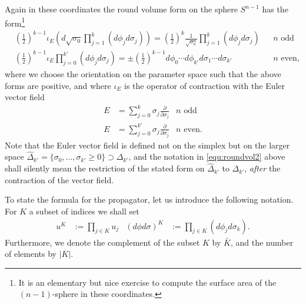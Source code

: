 \documentclass[a4paper]{amsart}
\theoremstyle{plain}
\theoremstyle{definition}
\begin{document}
Again in these coordinates the round volume form on the sphere $S^{n-1}$ has the form\footnote{It is an elementary but nice exercise to compute the surface area of the $(n-1)$-sphere in these coordinates.}
\begin{align}
&\left(\frac 1 2\right)^{k-1} \iota_E \left( d\sqrt{\sigma_0}\prod_{j=1}^{k} (d\phi_j d\sigma_j) \right) = \left(\frac 1 2\right)^{k}\frac 1 {\sqrt{\sigma_0}} \prod_{j=1}^k (d\phi_j d\sigma_j) && \text{$n$ odd} \\
\label{equ:roundvol2}
&\left(\frac 1 2\right)^{k-1} \iota_E \prod_{j=0}^{k'} (d\phi_j d\sigma_j)  = \pm \left(\frac 1 2\right)^{k-1} d\phi_0\cdots d\phi_{k'} d\sigma_1\cdots d\sigma_{k'}   && \text{$n$ even},
\end{align}
where we choose the orientation on the parameter space such that the above forms are positive, and where $\iota_E$ is the operator of contraction with the Euler vector field
\begin{align*}
E&= \sum_{j=0}^{k} \sigma_j \frac \partial {\partial \sigma_j} & \text{$n$ odd} \\
E&= \sum_{j=0}^{k'} \sigma_j \frac \partial {\partial \sigma_j} & \text{$n$ even}.
\end{align*}
Note that the Euler vector field is defined not on the simplex but on the larger space $\hat \Delta_{k'} = \{\sigma_0,\dots,\sigma_{k'}\geq 0\}\supset \Delta_{k'}$, and the notation in \eqref{equ:roundvol2} above shall silently mean the restriction of the stated form on $\hat \Delta_{k'}$ to $\Delta_{k'}$, {\em after} the contraction of the vector field.

To state the formula for the propagator, let us introduce the following notation. For $K$ a subset of indices we shall set
\begin{align*}
u^K &:= \prod_{j\in K} u_j & 
(d\phi d\sigma)^K &:= \prod_{j\in K}(d\phi_j d\sigma_k).
\end{align*}
Furthermore, we denote the complement of the subset $K$ by $\bar K$, and the number of elements by $|K|$.
\end{document}

